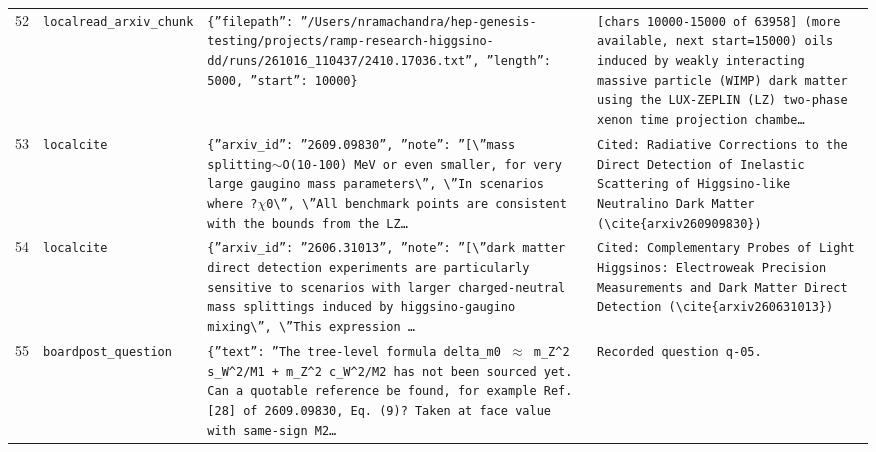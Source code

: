 \documentclass[11pt,a4paper]{article}
\begin{document}
\begin{longtable}{@{}p{}p{}p{}p{}@{}}
52 & \texttt{local}\newline\texttt{read\_\allowbreak{}arxiv\_\allowbreak{}chunk} & \texttt{\{''filepath'':\allowbreak{} ''/\allowbreak{}Users/\allowbreak{}nramachandra/\allowbreak{}hep-genesis-testing/\allowbreak{}projects/\allowbreak{}ramp-research-higgsino-dd/\allowbreak{}runs/\allowbreak{}261016\_\allowbreak{}110437/\allowbreak{}2410.17036.txt'',\allowbreak{} ''length'':\allowbreak{} 5000,\allowbreak{} ''start'':\allowbreak{} 10000\}\allowbreak{}} & \texttt{[chars 10000-15000 of 63958]\allowbreak{} (more available,\allowbreak{} next start=\allowbreak{}15000)\allowbreak{}  oils induced by weakly interacting massive particle (WIMP)\allowbreak{} dark matter using the LUX-ZEPLIN (LZ)\allowbreak{} two-phase xenon time projection chambe\ldots{}\allowbreak{}} \\
53 & \texttt{local}\newline\texttt{cite} & \texttt{\{''arxiv\_\allowbreak{}id'':\allowbreak{} ''2609.09830'',\allowbreak{} ''note'':\allowbreak{} ''[\textbackslash{}\allowbreak{}''mass splitting$\sim$O(10-100)\allowbreak{} MeV or even smaller,\allowbreak{} for very large gaugino mass parameters\textbackslash{}\allowbreak{}'',\allowbreak{} \textbackslash{}\allowbreak{}''In scenarios where ?$\chi$0\textbackslash{}\allowbreak{}'',\allowbreak{} \textbackslash{}\allowbreak{}''All benchmark points are consistent with the bounds from the LZ\ldots{}\allowbreak{}} & \texttt{Cited:\allowbreak{} Radiative Corrections to the Direct Detection of Inelastic Scattering of Higgsino-like Neutralino Dark Matter (\textbackslash{}\allowbreak{}cite\{arxiv260909830\}\allowbreak{})\allowbreak{}} \\
54 & \texttt{local}\newline\texttt{cite} & \texttt{\{''arxiv\_\allowbreak{}id'':\allowbreak{} ''2606.31013'',\allowbreak{} ''note'':\allowbreak{} ''[\textbackslash{}\allowbreak{}''dark matter direct detection experiments are particularly sensitive to scenarios with larger charged-neutral mass splittings induced by higgsino-gaugino mixing\textbackslash{}\allowbreak{}'',\allowbreak{} \textbackslash{}\allowbreak{}''This expression \ldots{}\allowbreak{}} & \texttt{Cited:\allowbreak{} Complementary Probes of Light Higgsinos:\allowbreak{} Electroweak Precision Measurements and Dark Matter Direct Detection (\textbackslash{}\allowbreak{}cite\{arxiv260631013\}\allowbreak{})\allowbreak{}} \\
55 & \texttt{board}\newline\texttt{post\_\allowbreak{}question} & \texttt{\{''text'':\allowbreak{} ''The tree-level formula delta\_\allowbreak{}m0 $\approx$ m\_\allowbreak{}Z\textasciicircum{}\allowbreak{}2 s\_\allowbreak{}W\textasciicircum{}\allowbreak{}2/\allowbreak{}M1 + m\_\allowbreak{}Z\textasciicircum{}\allowbreak{}2 c\_\allowbreak{}W\textasciicircum{}\allowbreak{}2/\allowbreak{}M2 has not been sourced yet. Can a quotable reference be found,\allowbreak{} for example Ref. [28]\allowbreak{} of 2609.09830,\allowbreak{} Eq. (9)\allowbreak{}? Taken at face value with same-sign M2\ldots{}\allowbreak{}} & \texttt{Recorded question q-05.} \\

\end{longtable}
\end{document}
